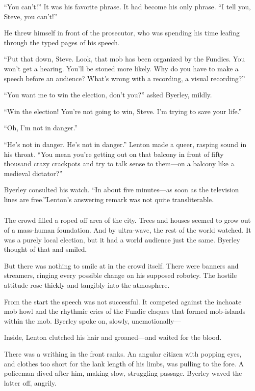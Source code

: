 \documentclass[10pt,a5paper,twoside]{book}
\begin{document}
“You can’t!” It was his favorite phrase. It had become his only phrase. “I tell you, Steve, you can’t!”

He threw himself in front of the prosecutor, who was spending his time leafing through the typed pages of his speech.

“Put that down, Steve. Look, that mob has been organized by the Fundies. You won’t get a hearing. You’ll be stoned more likely. Why do you have to make a speech before an audience? What’s wrong with a recording, a visual recording?”

“You want me to win the election, don’t you?” asked Byerley, mildly.

“Win the election! You’re not going to win, Steve. I’m trying to save your life.”

“Oh, I’m not in danger.”

“He’s not in danger. He’s not in danger.” Lenton made a queer, rasping sound in his throat. “You mean you’re getting out on that balcony in front of fifty thousand crazy crackpots and try to talk sense to them—on a balcony like a medieval dictator?”

Byerley consulted his watch. “In about five minutes—as soon as the television lines are free.”Lenton’s answering remark was not quite transliterable.

\subsubsection*{}
The crowd filled a roped off area of the city. Trees and houses seemed to grow out of a mass-human foundation. And by ultra-wave, the rest of the world watched. It was a purely local election, but it had a world audience just the same. Byerley thought of that and smiled.

But there was nothing to smile at in the crowd itself. There were banners and streamers, ringing every possible change on his supposed robotcy. The hostile attitude rose thickly and tangibly into the atmosphere.

From the start the speech was not successful. It competed against the inchoate mob howl and the rhythmic cries of the Fundie claques that formed mob-islands within the mob. Byerley spoke on, slowly, unemotionally—

Inside, Lenton clutched his hair and groaned—and waited for the blood.

There was a writhing in the front ranks. An angular citizen with popping eyes, and clothes too short for the lank length of his limbs, was pulling to the fore. A policeman dived after him, making slow, struggling passage. Byerley waved the latter off, angrily.
\end{document}
